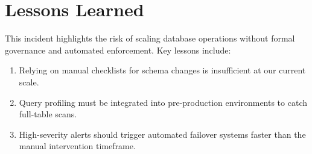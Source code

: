 \section{Lessons Learned}
This incident highlights the risk of scaling database operations without formal governance and automated enforcement. Key lessons include:
\begin{enumerate}[label=\textbf{\arabic*.}, leftmargin=15pt, nosep]
  \item Relying on manual checklists for schema changes is insufficient at our current scale.
  \item Query profiling must be integrated into pre-production environments to catch full-table scans.
  \item High-severity alerts should trigger automated failover systems faster than the manual intervention timeframe.
\end{enumerate}

\newpage


